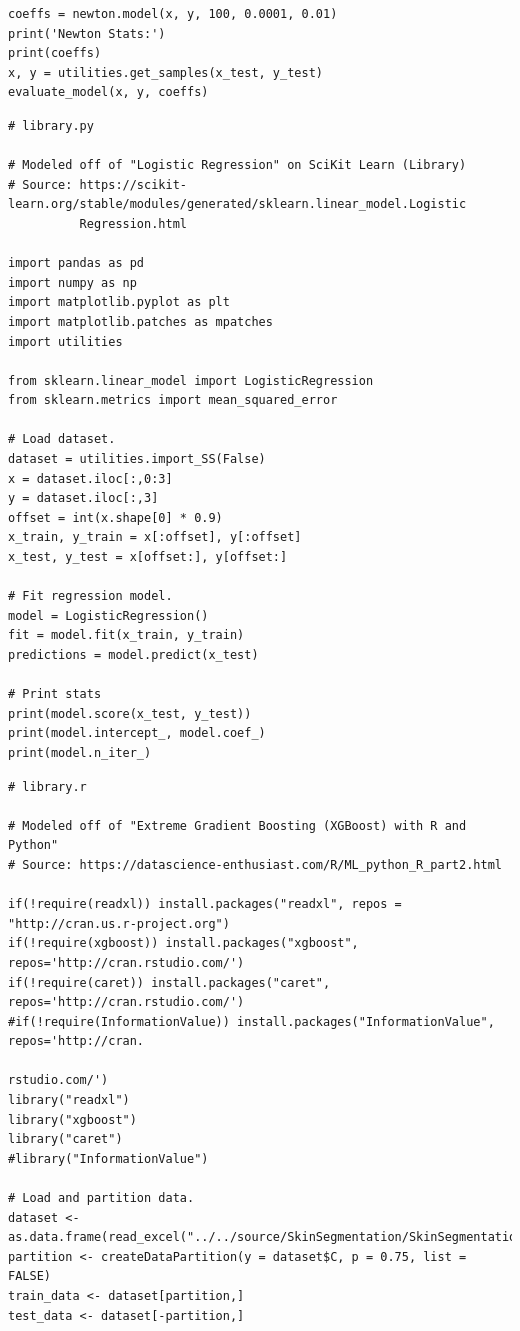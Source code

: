 \documentclass[letterpaper]{article} %
\begin{document}
{\begin{verbatim}
coeffs = newton.model(x, y, 100, 0.0001, 0.01)
print('Newton Stats:')
print(coeffs)
x, y = utilities.get_samples(x_test, y_test)
evaluate_model(x, y, coeffs)
\end{verbatim}

\bigskip

\begin{verbatim}
# library.py

# Modeled off of "Logistic Regression" on SciKit Learn (Library)
# Source: https://scikit-learn.org/stable/modules/generated/sklearn.linear_model.Logistic
          Regression.html

import pandas as pd
import numpy as np
import matplotlib.pyplot as plt
import matplotlib.patches as mpatches
import utilities

from sklearn.linear_model import LogisticRegression
from sklearn.metrics import mean_squared_error

# Load dataset.
dataset = utilities.import_SS(False)
x = dataset.iloc[:,0:3]
y = dataset.iloc[:,3]
offset = int(x.shape[0] * 0.9)
x_train, y_train = x[:offset], y[:offset]
x_test, y_test = x[offset:], y[offset:]

# Fit regression model.
model = LogisticRegression()
fit = model.fit(x_train, y_train)
predictions = model.predict(x_test)

# Print stats
print(model.score(x_test, y_test))
print(model.intercept_, model.coef_)
print(model.n_iter_)
\end{verbatim}

\bigskip

\begin{verbatim}
# library.r

# Modeled off of "Extreme Gradient Boosting (XGBoost) with R and Python"
# Source: https://datascience-enthusiast.com/R/ML_python_R_part2.html

if(!require(readxl)) install.packages("readxl", repos = "http://cran.us.r-project.org")
if(!require(xgboost)) install.packages("xgboost", repos='http://cran.rstudio.com/')
if(!require(caret)) install.packages("caret", repos='http://cran.rstudio.com/')
#if(!require(InformationValue)) install.packages("InformationValue", repos='http://cran.
                                                                         rstudio.com/')
library("readxl")
library("xgboost")
library("caret")
#library("InformationValue")

# Load and partition data.
dataset <- as.data.frame(read_excel("../../source/SkinSegmentation/SkinSegmentation.xlsx"))
partition <- createDataPartition(y = dataset$C, p = 0.75, list = FALSE)
train_data <- dataset[partition,]
test_data <- dataset[-partition,]


\end{verbatim}}
\end{document}

